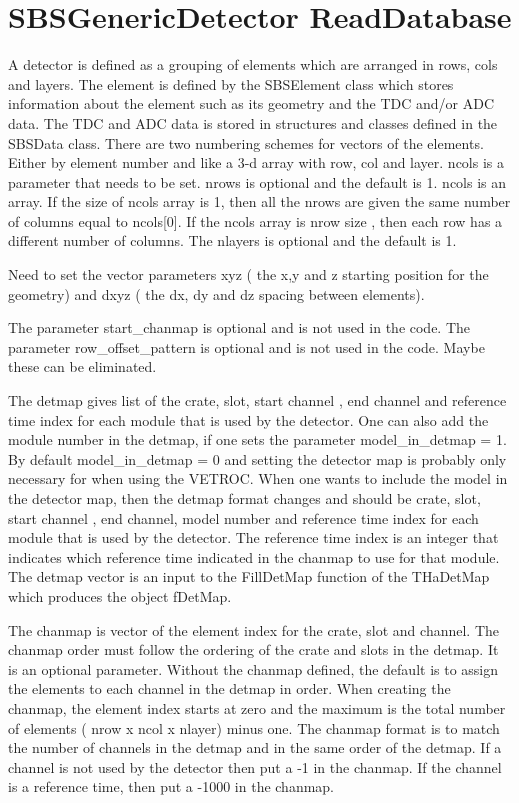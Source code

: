 \documentclass[11pt]{article}
\begin{document}
\section{SBSGenericDetector ReadDatabase}
A detector is defined as a grouping of elements which are arranged in rows, cols and layers.
The element is defined by the SBSElement class which stores information about the element
such as its geometry and the TDC and/or ADC data. The TDC and ADC data is stored in structures
and classes defined in the SBSData class.
There are two numbering schemes for vectors of the elements.
Either by element number and like a 3-d array with row, col and layer.
ncols is a parameter that needs to be set. nrows is optional and the default is 1. ncols is an array. 
If the size of ncols array is 1, then all the nrows are given the same number of columns equal to ncols[0].
If the ncols array is nrow size , then each row has a different number of columns.
The nlayers is optional and the default is 1. 

Need to set the vector parameters xyz ( the x,y and z starting position for the
geometry) and dxyz ( the dx, dy and dz spacing between elements).

The parameter start\_chanmap is optional and is not used in the code. The parameter
row\_offset\_pattern is optional and is not used in the code. Maybe these can be eliminated.






The detmap gives list of the crate, slot, start channel , end channel and reference time index
for each module that is used by the detector.
One can also add the module number in the detmap, if one sets 
the parameter model\_in\_detmap = 1. By default model\_in\_detmap = 0 and setting the
detector map is probably only necessary for when using the VETROC.
When one wants to include the model in the detector map, then the detmap format changes
and should be crate, slot, start channel , end channel, model number and reference time index
for each module that is used by the detector.
The reference time index is an integer that indicates which reference time indicated in the chanmap to use
for that module.
The detmap vector is an input to the FillDetMap function of the THaDetMap which produces the object fDetMap.



The chanmap is vector of the element index for the crate, slot and channel. The chanmap
order must follow the ordering of the crate and slots in the detmap.
It is an optional parameter. Without the chanmap defined, the default is to assign the
elements to each channel in the detmap in order.
When creating the chanmap, the element index starts at zero 
and the maximum is the total number of elements ( nrow x ncol x nlayer)
minus one. The chanmap format is to match the number of channels in the detmap and
in the same order of the detmap. If a channel is not used by the detector then put a -1
in the chanmap. If the channel is a reference time, then put a -1000 in the chanmap.
\end{document}
